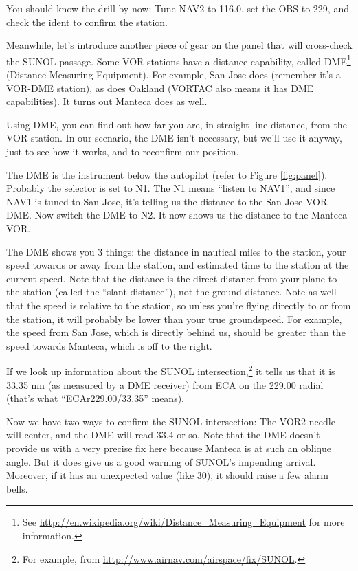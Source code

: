 
You should know the drill by now: Tune NAV2 to 116.0, set the OBS to
229, and check the ident to confirm the station.

Meanwhile, let's introduce another piece of gear on the panel that
will cross-check the SUNOL passage.  Some VOR stations have a distance
capability, called DME\footnote{See
  \url{http://en.wikipedia.org/wiki/Distance_Measuring_Equipment} for
  more information.} (Distance Measuring Equipment).  For example, San
Jose does (remember it's a VOR-DME station), as does Oakland (VORTAC
also means it has DME capabilities).  It turns out Manteca does as
well.

Using DME, you can find out how far you are, in straight-line
distance, from the VOR station.  In our scenario, the DME isn't
necessary, but we'll use it anyway, just to see how it works, and to
reconfirm our position.

The DME is the instrument below the autopilot (refer to Figure
\ref{fig:panel}).  Probably the selector is set to N1.  The N1 means
``listen to NAV1'', and since NAV1 is tuned to San Jose, it's telling
us the distance to the San Jose VOR-DME.  Now switch the DME to N2.
It now shows us the distance to the Manteca VOR.

The DME shows you 3 things: the distance in nautical miles to the
station, your speed towards or away from the station, and estimated
time to the station at the current speed.  Note that the distance is
the direct distance from your plane to the station (called the ``slant
distance''), not the ground distance.  Note as well that the speed is
relative to the station, so unless you're flying directly to or from
the station, it will probably be lower than your true groundspeed.
For example, the speed from San Jose, which is directly behind us,
should be greater than the speed towards Manteca, which is off to the
right.

If we look up information about the SUNOL intersection,\footnote{For
  example, from \url{http://www.airnav.com/airspace/fix/SUNOL}.} it
tells us that it is 33.35 nm (as measured by a DME receiver) from ECA
on the 229.00 radial (that's what ``ECAr229.00/33.35'' means).

Now we have two ways to confirm the SUNOL intersection: The VOR2
needle will center, and the DME will read 33.4 or so.  Note that the
DME doesn't provide us with a very precise fix here because Manteca is
at such an oblique angle.  But it does give us a good warning of
SUNOL's impending arrival.  Moreover, if it has an unexpected value
(like 30), it should raise a few alarm bells.

